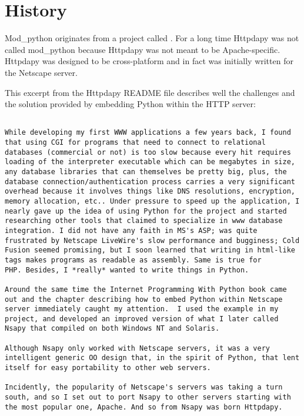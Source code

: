 \begin{seealso}
\end{seealso}

\section{History\label{intr-history}}

Mod_python originates from a project called
. For
a long time Httpdapy was not called mod_python because Httpdapy was
not meant to be Apache-specific. Httpdapy was designed to be
cross-platform and in fact was initially written for the Netscape
server.

This excerpt from the Httpdapy README file describes well the
challenges and the solution provided by embedding Python within the
HTTP server:

\begin{verbatim}

While developing my first WWW applications a few years back, I found
that using CGI for programs that need to connect to relational
databases (commercial or not) is too slow because every hit requires
loading of the interpreter executable which can be megabytes in size,
any database libraries that can themselves be pretty big, plus, the
database connection/authentication process carries a very significant
overhead because it involves things like DNS resolutions, encryption,
memory allocation, etc.. Under pressure to speed up the application, I
nearly gave up the idea of using Python for the project and started
researching other tools that claimed to specialize in www database
integration. I did not have any faith in MS's ASP; was quite
frustrated by Netscape LiveWire's slow performance and bugginess; Cold
Fusion seemed promising, but I soon learned that writing in html-like
tags makes programs as readable as assembly. Same is true for
PHP. Besides, I *really* wanted to write things in Python.

Around the same time the Internet Programming With Python book came
out and the chapter describing how to embed Python within Netscape
server immediately caught my attention.  I used the example in my
project, and developed an improved version of what I later called
Nsapy that compiled on both Windows NT and Solaris.

Although Nsapy only worked with Netscape servers, it was a very
intelligent generic OO design that, in the spirit of Python, that lent
itself for easy portability to other web servers.

Incidently, the popularity of Netscape's servers was taking a turn
south, and so I set out to port Nsapy to other servers starting with
the most popular one, Apache. And so from Nsapy was born Httpdapy.

\end{verbatim}


